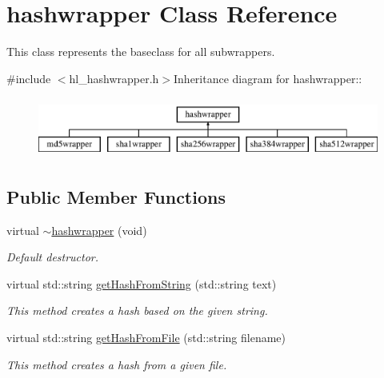 \hypertarget{classhashwrapper}{
\section{hashwrapper Class Reference}
\label{classhashwrapper}
}


This class represents the baseclass for all subwrappers.  


{\ttfamily \#include $<$hl\_\-hashwrapper.h$>$}Inheritance diagram for hashwrapper::\begin{figure}[H]
\begin{center}
\leavevmode
\includegraphics[height=2cm]{classhashwrapper}
\end{center}
\end{figure}
\subsection*{Public Member Functions}
\begin{DoxyCompactItemize}
\item 
virtual \hyperlink{classhashwrapper_a0868440d13aa86a1bccca35e99a81381}{$\sim$hashwrapper} (void)
\begin{DoxyCompactList}\small\item\em Default destructor. \item\end{DoxyCompactList}\item 
virtual std::string \hyperlink{classhashwrapper_aa10904f0dc06eb54771ab26864622d0f}{getHashFromString} (std::string text)
\begin{DoxyCompactList}\small\item\em This method creates a hash based on the given string. \item\end{DoxyCompactList}\item 
virtual std::string \hyperlink{classhashwrapper_ae4767e76e6d9e2b24b41f01ab9e7f03c}{getHashFromFile} (std::string filename)
\begin{DoxyCompactList}\small\item\em This method creates a hash from a given file. \item\end{DoxyCompactList}\end{DoxyCompactItemize}
